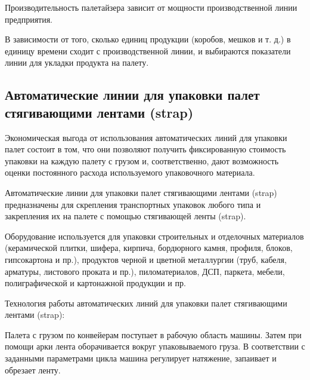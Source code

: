 Производительность палетайзера зависит от мощности производственной линии предприятия. 

В зависимости от того, сколько единиц продукции (коробов, мешков и т. д.) в единицу времени сходит с производственной линии, и выбираются показатели линии для укладки продукта на палету.


\subsection*{Автоматические линии для упаковки палет стягивающими лентами (strap)}

Экономическая выгода от использования автоматических линий для упаковки палет состоит в том, что они позволяют получить фиксированную стоимость упаковки на каждую палету с грузом и, соответственно, дают возможность оценки постоянного расхода используемого упаковочного материала. 

Автоматические линии для упаковки палет стягивающими лентами (strap) предназначены для скрепления транспортных упаковок любого типа и закрепления их на палете с помощью стягивающей ленты (strap).

Оборудование используется для упаковки строительных и отделочных материалов (керамической плитки, шифера, кирпича, бордюрного камня, профиля, блоков, гипсокартона и пр.), продуктов черной и цветной металлургии (труб, кабеля, арматуры, листового проката и пр.), пиломатериалов, ДСП, паркета, мебели, полиграфической и картонажной продукции и пр. 

Технология работы автоматических линий для упаковки палет стягивающими лентами (strap):

Палета с грузом по конвейерам поступает в рабочую область машины. Затем при помощи арки лента оборачивается вокруг упаковываемого груза. В соответствии с заданными параметрами цикла машина регулирует натяжение, запаивает и обрезает ленту. 

